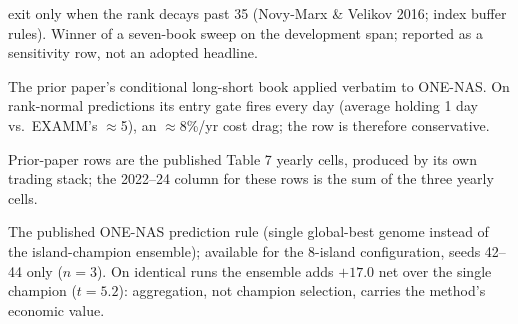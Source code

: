 \documentclass[11pt]{article}
\begin{document}
\begin{table}[h]
\begin{threeparttable}
\begin{tablenotes}
exit only when the rank decays past 35 (Novy-Marx \& Velikov 2016; index
buffer rules). Winner of a seven-book sweep on the development span;
reported as a sensitivity row, not an adopted headline.
\item[b] The prior paper's conditional long-short book applied verbatim to
ONE-NAS. On rank-normal predictions its entry gate fires every day (average
holding 1 day vs.\ EXAMM's $\approx$5), an $\approx$8\%/yr cost drag; the
row is therefore conservative.
\item[c] Prior-paper rows are the published Table 7 yearly cells, produced
by its own trading stack; the 2022--24 column for these rows is the sum of
the three yearly cells.
\item[d] The published ONE-NAS prediction rule (single global-best genome
instead of the island-champion ensemble); available for the 8-island
configuration, seeds 42--44 only ($n=3$). On identical runs the ensemble
adds $+17.0$ net over the single champion ($t=5.2$): aggregation, not
champion selection, carries the method's economic value.
\end{tablenotes}
\end{threeparttable}
\end{table}
\end{document}
